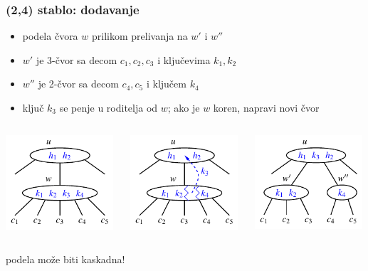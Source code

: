 \documentclass[compress,aspectratio=169]{beamer}
\begin{document}
\begin{frame}[fragile]
  \frametitle{(2,4) stablo: dodavanje}
  \begin{itemize}
    \item podela čvora $w$ prilikom prelivanja na $w'$ i $w''$
    \item $w'$ je 3-čvor sa decom $c_1, c_2, c_3$ i ključevima $k_1, k_2$
    \item $w''$ je 2-čvor sa decom $c_4, c_5$ i ključem $k_4$
    \item ključ $k_3$ se penje u roditelja od $w$; ako je $w$ koren, napravi novi čvor 
  \end{itemize}
  \begin{columns}
    \begin{column}[c]{4cm}
      \begin{center}
        \includegraphics[width=4cm]{asp-11-pic31.pdf}
      \end{center}
    \end{column}
    \begin{column}[c]{4cm}
      \begin{center}
        \includegraphics[width=4cm]{asp-11-pic32.pdf}
      \end{center}
    \end{column}
    \begin{column}[c]{4cm}
      \begin{center}
        \includegraphics[width=4cm]{asp-11-pic33.pdf}
      \end{center}
    \end{column}
  \end{columns}
  podela može biti kaskadna!
\end{frame}
\end{document}
